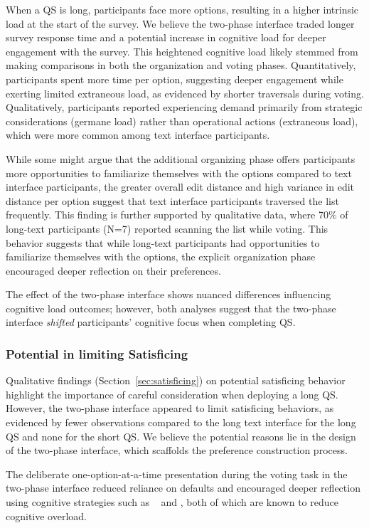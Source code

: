 {When a QS is long, participants face more options, resulting in a higher intrinsic load at the start of the survey. We believe the two-phase interface traded longer survey response time and a potential increase in cognitive load for deeper engagement with the survey. This heightened cognitive load likely stemmed from making comparisons in both the organization and voting phases. Quantitatively, participants spent more time per option, suggesting deeper engagement while exerting limited extraneous load, as evidenced by shorter traversals during voting. Qualitatively, participants reported experiencing demand primarily from strategic considerations (germane load) rather than operational actions (extraneous load), which were more common among text interface participants.

While some might argue that the additional organizing phase offers participants more opportunities to familiarize themselves with the options compared to text interface participants, the greater overall edit distance and high variance in edit distance per option suggest that text interface participants traversed the list frequently. This finding is further supported by qualitative data, where 70\% of long-text participants (N=7) reported scanning the list while voting. This behavior suggests that while long-text participants had opportunities to familiarize themselves with the options, the explicit organization phase encouraged deeper reflection on their preferences.

The effect of the two-phase interface shows nuanced differences influencing cognitive load outcomes; however, both analyses suggest that the two-phase interface \textit{shifted} participants' cognitive focus when completing QS.

\subsubsection{Potential in limiting Satisficing}
Qualitative findings (Section~\ref{sec:satisficing}) on potential satisficing behavior highlight the importance of careful consideration when deploying a long QS. However, the two-phase interface appeared to limit satisficing behaviors, as evidenced by fewer observations compared to the long text interface for the long QS and none for the short QS. We believe the potential reasons lie in the design of the two-phase interface, which scaffolds the preference construction process.

The deliberate one-option-at-a-time presentation during the voting task in the two-phase interface reduced reliance on defaults and encouraged deeper reflection using cognitive strategies such as \textit{}~\cite{simonSciencesArtificial1996} and \textit{}, both of which are known to reduce cognitive overload.

}
